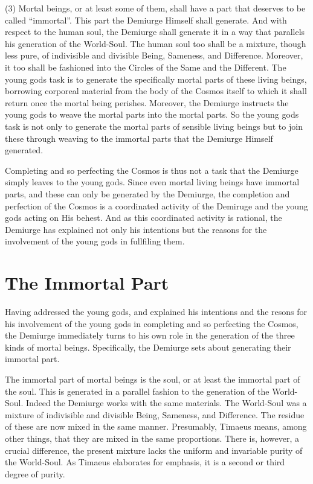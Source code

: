 (3) Mortal beings, or at least some of them, shall have a part that deserves to be called ``immortal''. This part the Demiurge Himself shall generate. And with respect to the human soul, the Demiurge shall generate it in a way that parallels his generation of the World-Soul. The human soul too shall be a mixture, though less pure, of indivisible and divisible Being, Sameness, and Difference. Moreover, it too shall be fashioned into the Circles of the Same and the Different. The young gods task is to generate the specifically mortal parts of these living beings, borrowing corporeal material from the body of the Cosmos itself to which it shall return once the mortal being perishes. Moreover, the Demiurge instructs the young gods to weave the mortal parts into the mortal parts. So the young gods task is not only to generate the mortal parts of sensible living beings but to join these through weaving to the immortal parts that the Demiurge Himself generated.

Completing and so perfecting the Cosmos is thus not a task that the Demiurge simply leaves to the young gods. Since even mortal living beings have immortal parts, and these can only be generated by the Demiurge, the completion and perfection of the Cosmos is a coordinated activity of the Demiruge and the young gods acting on His behest. And as this coordinated activity is rational, the Demiurge has explained not only his intentions but the reasons for the involvement of the young gods in fullfiling them.


\section{The Immortal Part} %
\label{sec:the_immortal_part}

Having addressed the young gods, and explained his intentions and the resons for his involvement of the young gods in completing and so perfecting the Cosmos, the Demiurge immediately turns to his own role in the generation of the three kinds of mortal beings. Specifically, the Demiurge sets about generating their immortal part. 

The immortal part of mortal beings is the soul, or at least the immortal part of the soul. This is generated in a parallel fashion to the generation of the World-Soul. Indeed the Demiurge works with the same materials. The World-Soul was a mixture of indivisible and divisible Being, Sameness, and Difference. The residue of these are now mixed in the same manner. Presumably, Timaeus means, among other things, that they are mixed in the same proportions. There is, however, a crucial difference, the present mixture lacks the uniform and invariable purity of the World-Soul. As Timaeus elaborates for emphasis, it is a second or third degree of purity. 

